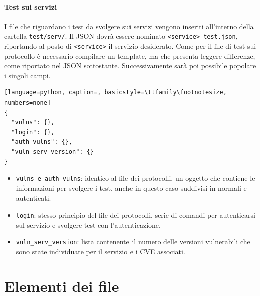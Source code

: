 \documentclass[12pt]{report}
\begin{document}
\noindent
\\
\textbf{Test sui servizi}
\\\\
I file che riguardano i test da svolgere sui servizi vengono inseriti all'interno della cartella \lstinline{test/serv/}. Il JSON dovrà essere nominato \lstinline{<service>_test.json}, riportando al posto di \lstinline{<service>} il servizio desiderato. Come per il file di test sui protocollo è necessario compilare un template, ma che presenta leggere differenze, come riportato nel JSON sottostante. Successivamente sarà poi possibile popolare i singoli campi.
\begin{lstlisting}[language=python, caption=, basicstyle=\ttfamily\footnotesize, numbers=none]
{
  "vulns": {},
  "login": {},
  "auth_vulns": {},
  "vuln_serv_version": {}
}
\end{lstlisting}
\begin{itemize}
    \item \lstinline{vulns e auth_vulns}: identico al file dei protocolli, un oggetto che contiene le informazioni per svolgere i test, anche in questo caso suddivisi in normali e autenticati.
    \item \lstinline{login}: stesso principio del file dei protocolli, serie di comandi per autenticarsi sul servizio e svolgere test con l'autenticazione.
    \item \lstinline{vuln_serv_version}: lista contenente il numero delle versioni vulnerabili che sono state individuate per il servizio e i CVE associati.
\end{itemize}

\section{Elementi dei file}
\end{document}
